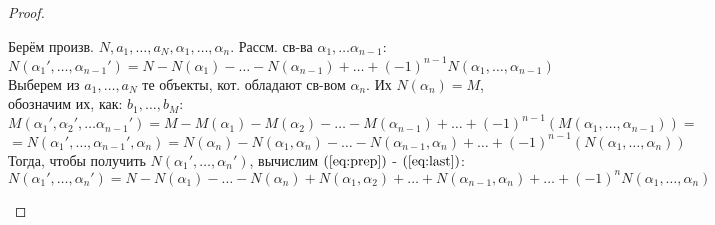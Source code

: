 \begin{itemize}
\begin{proof}
\begin{itemize}
\[      \]
      Берём произв. $N, a_1, \ldots, a_N, \alpha_1, \ldots, \alpha_n$. Рассм. св-ва $\alpha_1, \ldots \alpha_{n - 1}$:
      \begin{equation}
        \label{eq:prep}
      N(\alpha_1', \ldots, \alpha_{n - 1}') = N - N(\alpha_1) - \ldots - N(\alpha_{n - 1}) + \ldots + (-1)^{n - 1}N(\alpha_1, \ldots, \alpha_{n - 1})
      \end{equation}
      Выберем из $a_1, \ldots, a_N$ те объекты, кот. обладают св-вом $\alpha_n$. Их $N(\alpha_n) = M$, обозначим их, как: $b_1, \ldots, b_M$:
      \[
      M(\alpha_1', \alpha_2', \ldots \alpha_{n - 1}') = M - M(\alpha_1) - M(\alpha_2) - \ldots - M(\alpha_{n - 1}) + \ldots + (-1)^{n - 1}(M(\alpha_1, \ldots, \alpha_{n - 1})) = 
      \]
      \begin{equation}
        \label{eq:last}
      =  N(\alpha_1', \ldots, \alpha_{n - 1}', \alpha_n) = N(\alpha_n) - N(\alpha_1, \alpha_n) - \ldots - N(\alpha_{n - 1}, \alpha_n) + \ldots + (-1)^{n - 1}(N(\alpha_1, \ldots, \alpha_{n}))
      \end{equation}
      Тогда, чтобы получить $N(\alpha_1', \ldots, \alpha_n')$, вычислим $(\ref{eq:prep})$ - $(\ref{eq:last})$:
      \[
      N(\alpha_1', \ldots, \alpha_n') = N - N(\alpha_1) - \ldots - N(\alpha_n) + N(\alpha_1, \alpha_2) + \ldots + N(\alpha_{n - 1}, \alpha_n) + \ldots + (-1)^{n}N(\alpha_1, \ldots, \alpha_n)
      \]
  \end{itemize}
  \end{proof}

\end{itemize}
